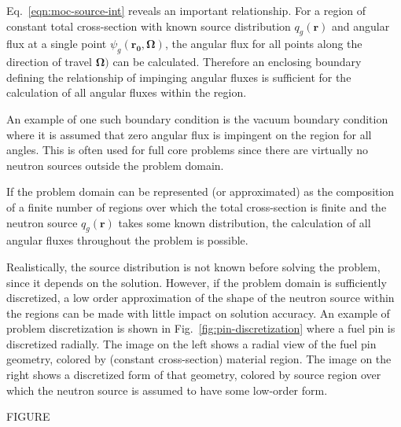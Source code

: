 Eq.~\ref{eqn:moc-source-int} reveals an important relationship. For a region of constant total cross-section with known source distribution $q_g(\mathbf{r})$ and angular flux at a single point $\psi_g(\mathbf{r_0},\mathbf{\Omega})$, the angular flux for all points along the direction of travel $\mathbf{\Omega})$ can be calculated. Therefore an enclosing boundary defining the relationship of impinging angular fluxes is sufficient for the calculation of all angular fluxes within the region.

An example of one such boundary condition is the vacuum boundary condition where it is assumed that zero angular flux is impingent on the region for all angles. This is often used for full core problems since there are virtually no neutron sources outside the problem domain.

If the problem domain can be represented (or approximated) as the composition of a finite number of regions over which the total cross-section is finite and the neutron source $q_g(\mathbf{r})$ takes some known distribution, the calculation of all angular fluxes throughout the problem is possible.

Realistically, the source distribution is not known before solving the problem, since it depends on the solution. However, if the problem domain is sufficiently discretized, a low order approximation of the shape of the neutron source within the regions can be made with little impact on solution accuracy. An example of problem discretization is shown in Fig.~\ref{fig:pin-discretization} where a fuel pin is discretized radially. The image on the left shows a radial view of the fuel pin geometry, colored by (constant cross-section) material region. The image on the right shows a discretized form of that geometry, colored by source region over which the neutron source is assumed to have some low-order form.

FIGURE


